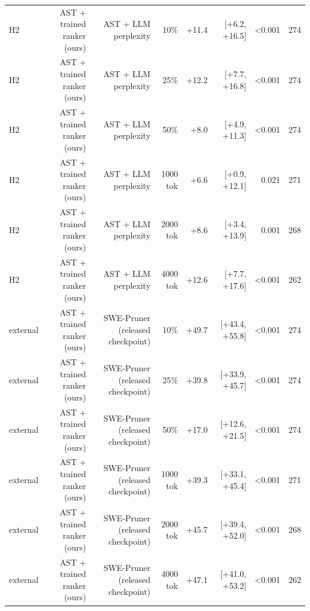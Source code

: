 \begin{tabular}{lrrrrrrr}
H2 & AST + trained ranker (ours) & AST + LLM perplexity & 10\% & +11.4 & [+6.2, +16.5] & <0.001 & 274 \\
H2 & AST + trained ranker (ours) & AST + LLM perplexity & 25\% & +12.2 & [+7.7, +16.8] & <0.001 & 274 \\
H2 & AST + trained ranker (ours) & AST + LLM perplexity & 50\% & +8.0 & [+4.9, +11.3] & <0.001 & 274 \\
H2 & AST + trained ranker (ours) & AST + LLM perplexity & 1000 tok & +6.6 & [+0.9, +12.1] & 0.021 & 271 \\
H2 & AST + trained ranker (ours) & AST + LLM perplexity & 2000 tok & +8.6 & [+3.4, +13.9] & 0.001 & 268 \\
H2 & AST + trained ranker (ours) & AST + LLM perplexity & 4000 tok & +12.6 & [+7.7, +17.6] & <0.001 & 262 \\
external & AST + trained ranker (ours) & SWE-Pruner (released checkpoint) & 10\% & +49.7 & [+43.4, +55.8] & <0.001 & 274 \\
external & AST + trained ranker (ours) & SWE-Pruner (released checkpoint) & 25\% & +39.8 & [+33.9, +45.7] & <0.001 & 274 \\
external & AST + trained ranker (ours) & SWE-Pruner (released checkpoint) & 50\% & +17.0 & [+12.6, +21.5] & <0.001 & 274 \\
external & AST + trained ranker (ours) & SWE-Pruner (released checkpoint) & 1000 tok & +39.3 & [+33.1, +45.4] & <0.001 & 271 \\
external & AST + trained ranker (ours) & SWE-Pruner (released checkpoint) & 2000 tok & +45.7 & [+39.4, +52.0] & <0.001 & 268 \\
external & AST + trained ranker (ours) & SWE-Pruner (released checkpoint) & 4000 tok & +47.1 & [+41.0, +53.2] & <0.001 & 262 \\
\bottomrule
\end{tabular}
